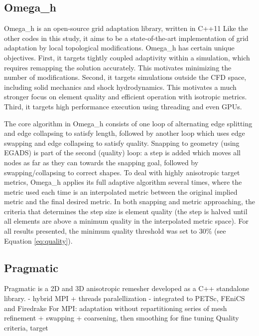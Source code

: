 \documentclass[3p,times,procedia,number]{elsarticle}
\begin{document}
\subsection{Omega\_h}

Omega\_h is an open-source grid adaptation library, written in C++11
\cite{ibanez-phd-thesis-heterogeneous-adapt,
ibanez-shephard-moving-shared-mem,
omega_h-website}
Like the other codes in this study, it aims to be a state-of-the-art
implementation of grid adaptation by local topological modifications.
Omega\_h has certain unique objectives.
First, it targets tightly coupled adaptivity within a simulation,
which requires remapping the solution accurately.
This motivates minimizing the number of modifications.
Second, it targets simulations outside the CFD space, including
solid mechanics and shock hydrodynamics.
This motivates a much stronger focus on element quality
and efficient operation with isotropic metrics.
Third, it targets high performance execution using threading
and even GPUs.

The core algorithm in Omega\_h consists of one loop of alternating
edge splitting and edge collapsing to satisfy length, followed by another loop
which uses edge swapping and edge collapsing to satisfy quality.
Snapping to geometry (using EGADS) is part of the second (quality) loop:
a step is added which moves all nodes as far as they can towards
the snapping goal, followed by swapping/collapsing to correct shapes.
To deal with highly anisotropic target metrics, Omega\_h applies
its full adaptive algorithm several times, where the metric used
each time is an interpolated metric between the original implied metric
and the final desired metric.
In both snapping and metric approaching, the criteria that determines
the step size is element quality (the step is halved until all elements
are above a minimum quality in the interpolated metric space).
For all results presented, the minimum quality threshold was set to 30\%
(see Equation \ref{eq:quality}).

\subsection{Pragmatic}

Pragmatic is a 2D and 3D anisotropic remesher developed as a C++ standalone library.
- hybrid MPI + threads paralellization 
- integrated to PETSc, FEniCS and Firedrake
For MPI: adaptation without repartitioning
series of mesh refinement + swapping + coarsening, then smoothing for fine tuning
Quality criteria, target
\end{document}
